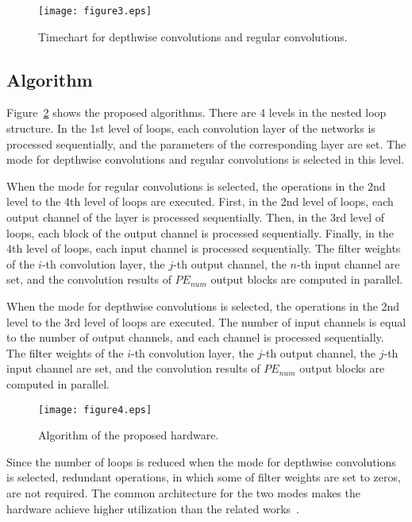\documentclass[runningheads]{llncs}
\begin{document}
\begin{figure}
\centering
\texttt{[image: figure3.eps]}
\caption{Timechart for depthwise convolutions and regular convolutions.}
\label{fig:timechart}
\end{figure}

\subsection{Algorithm}
\label{subsec:algorithm}

Figure~\ref{fig:algorithm} shows the proposed algorithms. There are 4 levels in the nested loop structure. In the 1st level of loops, each convolution layer of the networks is processed sequentially, and the parameters of the corresponding layer are set. The mode for depthwise convolutions and regular convolutions is selected in this level.

When the mode for regular convolutions is selected, the operations in the 2nd level to the 4th level of loops are executed. First, in the 2nd level of loops, each output channel of the layer is processed sequentially. Then, in the 3rd level of loops, each block of the output channel is processed sequentially. Finally, in the 4th level of loops, each input channel is processed sequentially. The filter weights of the $i$-th convolution layer, the $j$-th output channel, the $n$-th input channel are set, and the convolution results of $PE_{num}$ output blocks are computed in parallel. 

When the mode for depthwise convolutions is selected, the operations in the 2nd level to the 3rd level of loops are executed. The number of input channels is equal to the number of output channels, and each channel is processed sequentially. The filter weights of the $i$-th convolution layer, the $j$-th output channel, the $j$-th input channel are set, and the convolution results of $PE_{num}$ output blocks are computed in parallel. 

\begin{figure}
\centering
\texttt{[image: figure4.eps]}
\caption{Algorithm of the proposed hardware.}
\label{fig:algorithm}
\end{figure}

Since the number of loops is reduced when the mode for depthwise convolutions is selected, redundant operations, in which some of filter weights are set to zeros, are not required. The common architecture for the two modes makes the hardware achieve higher utilization than the related works~\cite{Liu19,Su18}.
\end{document}
